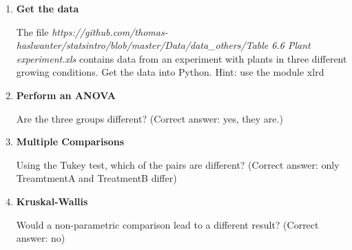 \begin{enumerate}
  \item \textbf{Get the data}

    The file   \emph{https://github.com/thomas-haslwanter/statsintro/blob/master/Data/data\_others/Table 6.6 Plant experiment.xls} contains data from an experiment with plants in three different growing conditions. Get the data into Python.
    Hint: use the module xlrd

  \item \textbf{Perform an ANOVA}

    Are the three groups different?
    (Correct answer: yes, they are.)

  \item \textbf{Multiple Comparisons}

    Using the Tukey test, which of the pairs are different?
    (Correct answer: only TreamtmentA and TreatmentB differ)

  \item \textbf{Kruskal-Wallis}

    Would a non-parametric comparison lead to a different result?
    (Correct answer: no)

\end{enumerate}
